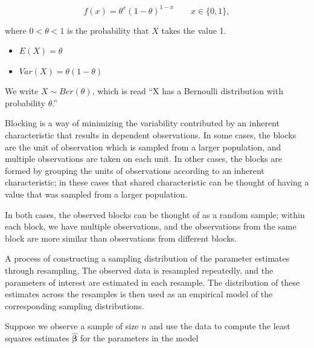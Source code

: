 \documentclass[
  letterpaper,
  DIV=11,
  numbers=noendperiod]{scrreprt}
\providecommand{\tightlist}{%
  \setlength{\itemsep}{0pt}\setlength{\parskip}{0pt}}\usepackage{longtable,booktabs,array}
\theoremstyle{definition}
\theoremstyle{definition}
\theoremstyle{remark}
\begin{document}
\[f(x) = \theta^x (1 - \theta)^{1 - x} \qquad x \in \{0, 1\},\]

where \(0 < \theta < 1\) is the probability that \(X\) takes the value
1.

\begin{itemize}
\tightlist
\item
  \(E(X) = \theta\)
\item
  \(Var(X) = \theta(1 - \theta)\)
\end{itemize}

We write \(X \sim Ber(\theta)\), which is read ``X has a Bernoulli
distribution with probability \(\theta\).''

\begin{description}
\tightlist
\item[Blocking (Definition~\ref{def-blocking})]
Blocking is a way of minimizing the variability contributed by an
inherent characteristic that results in dependent observations. In some
cases, the blocks are the unit of observation which is sampled from a
larger population, and multiple observations are taken on each unit. In
other cases, the blocks are formed by grouping the units of observations
according to an inherent characteristic; in these cases that shared
characteristic can be thought of having a value that was sampled from a
larger population.
\end{description}

In both cases, the observed blocks can be thought of as a random sample;
within each block, we have multiple observations, and the observations
from the same block are more similar than observations from different
blocks.

\begin{description}
\tightlist
\item[Bootstrapping (Definition~\ref{def-bootstrapping})]
A process of constructing a sampling distribution of the parameter
estimates through resampling. The observed data is resampled repeatedly,
and the parameters of interest are estimated in each resample. The
distribution of these estimates across the resamples is then used as an
empirical model of the corresponding sampling distributions.
\item[Case Resampling Bootstrap
(Definition~\ref{def-case-resampling-bootstrap})]
Suppose we observe a sample of size \(n\) and use the data to compute
the least squares estimates \(\widehat{\boldsymbol{\beta}}\) for the
parameters in the model
\end{description}
\end{document}
